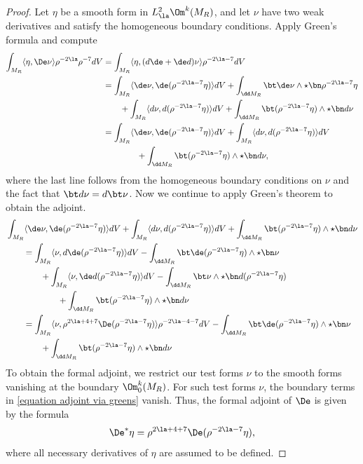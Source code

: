 \documentclass[hidelinks, 12pt, oneside, reqno]{amsart}
\begin{document}
\begin{proof} Let $\eta $ be a smooth form in $L^2_{\la} \Om^k(M_R)$, and let $\nu$ have two weak derivatives and satisfy the homogeneous boundary conditions. Apply Green's formula \cite[Proposition 2.1.2]{HodgeDecompSchwarz} and compute
    \begin{align*}
        \int_{M_R} \langle \eta, \De \nu \rangle \rho^{-2\la}\rho^{-7} dV & = \int_{M_R} \langle \eta, (d\de + \de d) \nu \rangle \rho^{-2\la -7} dV\\
        &= \int_{M_R} \langle \de \nu, \de (\rho^{-2\la- 7} \eta) \rangle dV + \int_{\dd M_R} \bt \de \nu \wedge \star \bn \rho^{-2\la- 7} \eta \\
        &\qquad + \int_{M_R} \langle d \nu, d (\rho^{-2\la- 7} \eta) \rangle dV + \int_{\dd M_R} \bt (\rho^{-2\la- 7} \eta) \wedge \star \bn d \nu \\
        &= \int_{M_R} \langle \de \nu, \de (\rho^{-2\la- 7} \eta) \rangle dV + \int_{M_R} \langle d \nu, d (\rho^{-2\la- 7} \eta) \rangle dV \\
        &\qquad \qquad + \int_{\dd M_R} \bt (\rho^{-2\la- 7} \eta) \wedge \star \bn d \nu,
    \end{align*}
    where the last line follows from the homogeneous boundary conditions on $\nu$ and the fact that $\bt d \nu = d \bt \nu$. Now we continue to apply Green's theorem to obtain the adjoint. 
    \begin{align}\label{equation adjoint via greens}
       &\int_{M_R} \langle \de \nu, \de (\rho^{-2\la- 7} \eta) \rangle dV + \int_{M_R} \langle d \nu, d (\rho^{-2\la- 7} \eta) \rangle dV + \int_{\dd M_R} \bt (\rho^{-2\la- 7} \eta) \wedge \star \bn d \nu \nonumber  \\ &\qquad = \int_{M_R} \langle  \nu, d\de (\rho^{-2\la- 7} \eta) \rangle dV - \int_{\dd M_R} \bt \de (\rho^{-2\la- 7} \eta) \wedge \star \bn \nu  \nonumber \\
       &\qquad \qquad + \int_{M_R} \langle \nu, \de d (\rho^{-2\la- 7} \eta) \rangle dV - \int_{\dd M_R} \bt \nu \wedge \star \bn d (\rho^{-2\la- 7} \eta) \nonumber\\
       &\qquad \qquad \qquad + \int_{\dd M_R} \bt (\rho^{-2\la- 7} \eta) \wedge \star \bn d \nu \nonumber \\
       &\qquad = \int_{M_R} \langle \nu, \rho^{2\la + 4 + 7}\De(\rho^{-2\la - 7} \eta) \rangle \rho^{-2\la -4 - 7} dV - \int_{\dd M_R} \bt \de (\rho^{-2\la- 7} \eta) \wedge \star \bn \nu \nonumber \\
       &\qquad \qquad + \int_{\dd M_R} \bt (\rho^{-2\la- 7} \eta) \wedge \star \bn d \nu 
    \end{align}
    To obtain the formal adjoint, we restrict our test forms $\nu$ to the smooth forms vanishing at the boundary $\Om^k_0(M_R)$. For such test forms $\nu$, the boundary terms in \eqref{equation adjoint via greens} vanish. Thus, the formal adjoint of $\De$ is given by the formula
    \[
    \De^*\eta = \rho^{2\la + 4 + 7}\De (\rho^{-2\la -7} \eta),
    \]
    where all necessary derivatives of $\eta$ are assumed to be defined. 
\end{proof}
\end{document}
